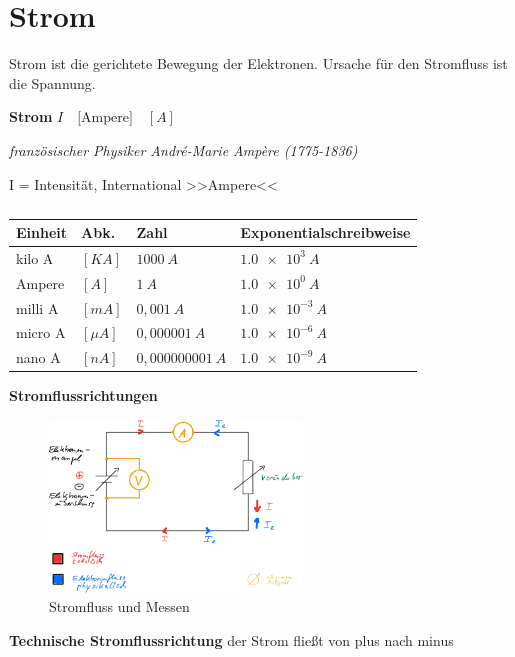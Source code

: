 \newpage

\section{Strom}\label{strom}

Strom ist die gerichtete Bewegung der Elektronen. Ursache für den
Stromfluss ist die Spannung.

\textbf{Strom} $I \quad \text{[Ampere]} \quad [A]$

\emph{französischer Physiker André-Marie Ampère (1775-1836)}

I = Intensität, International >>Ampere<<

\begin{table}[!ht]%
\centering 
	\caption{}%
\begin{tabular}{@{}llll@{}}
\hline
\textbf{Einheit} & \textbf{Abk.} & \textbf{Zahl} &
\textbf{Exponentialschreibweise} \\
\hline
kilo A & $[KA]$ & $1000~A$ & $\num{1,0e3}~A$ \\
Ampere & $[A]$ & $1~A$ & $\num{1,0e0}~A$ \\
milli A & $[mA]$ & $0,001~A$ & $\num{1,0e-3}~A$ \\
micro A & $[\mu A]$ & $0,000001~A$ & $\num{1,0e-6}~A$ \\
nano A & $[nA]$ & $0,000000001~A$ & $\num{1,0e-9}~A$ \\
\hline
\end{tabular} 
\end{table}

\textbf{Stromflussrichtungen}

\begin{figure}[!ht]%
\centering
\includegraphics[width=0.6\textwidth]{images/Skizze/06_Stromfluss_Messen_Skizze.pdf}
\caption{Stromfluss und Messen}
\end{figure}

\textbf{Technische Stromflussrichtung} der Strom fließt von plus nach
minus


